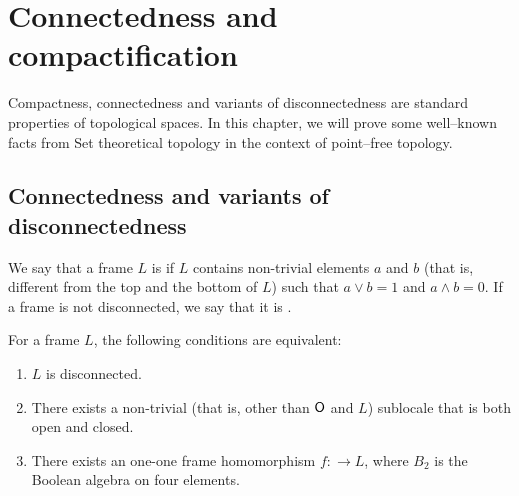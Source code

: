 \chapter{Connectedness and compactification}

Compactness, connectedness and variants of disconnectedness are standard properties of topological spaces.
In this chapter, we will prove some well--known facts from Set theoretical topology in the context of point--free topology.

\section{Connectedness and variants of disconnectedness}
\begin{definition}
    We say that a frame $L$ is  if $L$ contains non-trivial elements $a$ and $b$ (that is, different from the top and the bottom of $L$) such that $a\vee b = 1$ and $a\wedge b = 0$. If a frame is not disconnected, we say that it is .
\end{definition}

\begin{observation}\label{p:disconnectednessEquivalently}
    For a frame $L$, the following conditions are equivalent:

    \begin{enumerate}
        \item $L$ is disconnected.
        \item There exists a non-trivial (that is, other than $\mathsf{O}$ and $L$) sublocale that is both open and closed.
        \item There exists an one-one frame homomorphism $f\colon $$ \to L$, where $B_2$ is the Boolean algebra on four elements.
    \end{enumerate}
\end{observation}

